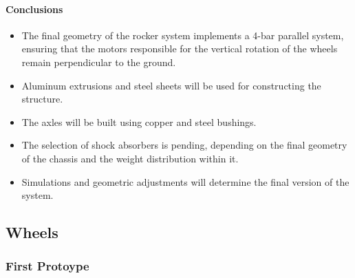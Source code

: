 \documentclass{article}
\begin{document}
\paragraph[short]{Conclusions}
\begin{itemize}
    \item The final geometry of the rocker system implements a 4-bar parallel system, ensuring that the motors responsible for the vertical rotation of the wheels remain perpendicular to the ground.
    \item Aluminum extrusions and steel sheets will be used for constructing the structure.
    \item The axles will be built using copper and steel bushings.
    \item The selection of shock absorbers is pending, depending on the final geometry of the chassis and the weight distribution within it.
    \item Simulations and geometric adjustments will determine the final version of the system.
\end{itemize}


\subsection[]{Wheels}

\subsubsection{First Protoype}
\end{document}
